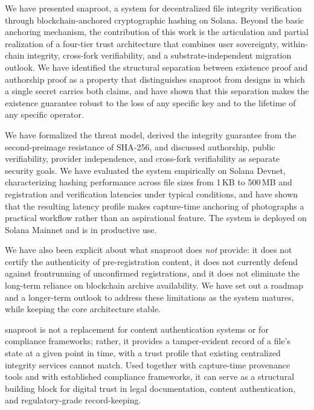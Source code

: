 \documentclass[11pt,a4paper]{article}
\begin{document}
We have presented snaproot, a system for decentralized file integrity
verification through blockchain-anchored cryptographic hashing on
Solana. Beyond the basic anchoring mechanism, the contribution of this
work is the articulation and partial realization of a four-tier trust
architecture that combines user sovereignty, within-chain integrity,
cross-fork verifiability, and a substrate-independent migration
outlook. We have identified the structural separation between existence
proof and authorship proof as a property that distinguishes snaproot
from designs in which a single secret carries both claims, and have
shown that this separation makes the existence guarantee robust to
the loss of any specific key and to the lifetime of any specific
operator.

We have formalized the threat model, derived the integrity guarantee
from the second-preimage resistance of SHA-256, and discussed
authorship, public verifiability, provider independence, and
cross-fork verifiability as separate security goals. We have evaluated
the system empirically on Solana Devnet, characterizing hashing
performance across file sizes from 1\,KB to 500\,MB and registration
and verification latencies under typical conditions, and have shown
that the resulting latency profile makes capture-time anchoring of
photographs a practical workflow rather than an aspirational feature.
The system is deployed on Solana Mainnet and is in productive use.

We have also been explicit about what snaproot does \emph{not}
provide: it does not certify the authenticity of pre-registration
content, it does not currently defend against frontrunning of
unconfirmed registrations, and it does not eliminate the long-term
reliance on blockchain archive availability. We have set out a roadmap
and a longer-term outlook to address these limitations as the system
matures, while keeping the core architecture stable.

snaproot is not a replacement for content authentication systems or
for compliance frameworks; rather, it provides a tamper-evident record
of a file's state at a given point in time, with a trust profile that
existing centralized integrity services cannot match. Used together
with capture-time provenance tools and with established compliance
frameworks, it can serve as a structural building block for digital
trust in legal documentation, content authentication, and
regulatory-grade record-keeping.

\end{document}
